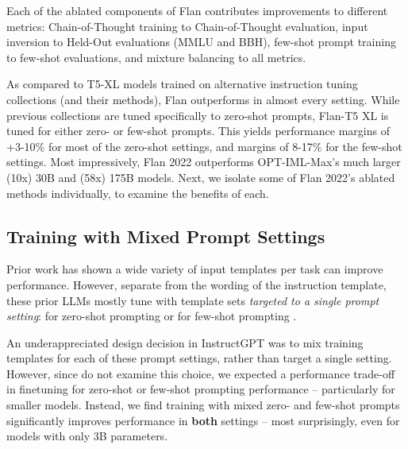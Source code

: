 Each of the ablated components of Flan contributes improvements to different metrics: Chain-of-Thought training to Chain-of-Thought evaluation, input inversion to Held-Out evaluations (MMLU and BBH), few-shot prompt training to few-shot evaluations, and mixture balancing to all metrics.

As compared to T5-XL models trained on alternative instruction tuning collections (and their methods), Flan outperforms in almost every setting. While previous collections are tuned specifically to zero-shot prompts, Flan-T5 XL is tuned for either zero- or few-shot prompts. This yields performance margins of +3-10\% for most of the zero-shot settings, and margins of 8-17\% for the few-shot settings. Most impressively, Flan 2022 outperforms OPT-IML-Max's much larger (10x) 30B and (58x) 175B models. Next, we isolate some of Flan 2022's ablated methods individually, to examine the benefits of each.

\subsection{Training with Mixed Prompt Settings}
\label{sec:mtft-zs-fs}
Prior work has shown a wide variety of input templates per task can improve performance. However, separate from the wording of the instruction template, these prior LLMs mostly tune with template sets \emph{targeted to a single prompt setting}: for zero-shot prompting \citep{wei2021finetuned, sanh2021multitask, aghajanyan-etal-2021-muppet,aribandi2021ext5} or for few-shot prompting \citep{min-etal-2022-metaicl, wang2022benchmarking}.

An underappreciated design decision in InstructGPT \citep{ouyang2022training} was to mix training templates for each of these prompt settings, rather than target a single setting. However, since \citet{ouyang2022training} do not examine this choice, we expected a performance trade-off in finetuning for zero-shot or few-shot prompting performance -- particularly for smaller models. Instead, we find training with mixed zero- and few-shot prompts significantly improves performance in \textbf{both} settings -- most surprisingly, even for models with only 3B parameters.

\makeatletter
\newenvironment{customlegend2}[1][]{
    \begingroup

    \pgfplots@init@cleared@structures
    \pgfplotsset{#1}
}{

    \pgfplots@createlegend
    \endgroup
}

\def\csname pgfplots@addlegendimage\endcsname{\csname pgfplots@addlegendimage\endcsname}

